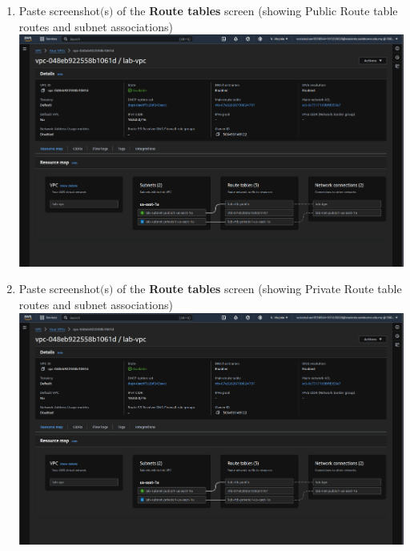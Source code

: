 \documentclass[11pt]{article}
\begin{document}
\begin{enumerate}
    \item Paste screenshot$($s$)$ of the \textbf{Route tables} screen (showing Public Route table routes and subnet associations) \\

    {\centering
    \includegraphics[width=5.8in]{pics/3.png}
    }

    \item Paste screenshot$($s$)$ of the \textbf{Route tables} screen (showing Private Route table routes and subnet associations) \\

    {\centering
    \includegraphics[width=5.8in]{pics/3.png}
    }

\end{enumerate}


\vspace{1cm}

\newpage
\end{document}
